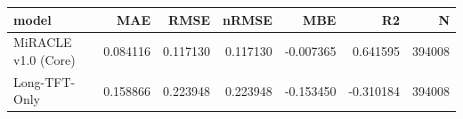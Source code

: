 \begin{tabular}{lrrrrrr}
\toprule
model & MAE & RMSE & nRMSE & MBE & R2 & N \\
\midrule
MiRACLE v1.0 (Core) & 0.084116 & 0.117130 & 0.117130 & -0.007365 & 0.641595 & 394008 \\
Long-TFT-Only & 0.158866 & 0.223948 & 0.223948 & -0.153450 & -0.310184 & 394008 \\
\bottomrule
\end{tabular}
